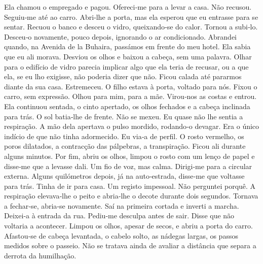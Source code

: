 Ela chamou o empregado e pagou. Ofereci­‑me para a levar a casa. Não
recusou. Seguiu­‑me até ao carro. Abri­‑lhe a porta, mas ela esperou que
eu entrasse para se sentar. Recuou o banco e desceu o vidro,
queixando­‑se do calor. Tornou a subi­‑lo. Desceu­‑o novamente, pouco
depois, ignorando o ar condicionado. Abrandei quando, na Avenida de la
Buhaira, passámos em frente do meu hotel. Ela sabia que eu ali morava.
Desviou os olhos e baixou a cabeça, sem uma palavra. Olhar para o
edifício de vidro parecia implicar algo que ela teria de recusar, ou a
que ela, se eu lho exigisse, não poderia dizer que não. Ficou calada até
pararmos diante da sua casa. Estremeceu. O filho estava à porta, voltado
para nós. Fixou o carro, sem expressão. Olhou para mim, para a mãe.
Virou­‑nos as costas e entrou. Ela continuou sentada, o cinto apertado,
os olhos fechados e a cabeça inclinada para trás. O sol batia­‑lhe de
frente. Não se mexeu. Eu quase não lhe sentia a respiração. A mão dela
apertava o pulso mordido, rodando­‑o devagar. Era o único indício de que
não tinha adormecido. Eu via­‑a de perfil. O rosto vermelho, os poros
dilatados, a contracção das pálpebras, a transpiração. Ficou ali durante
alguns minutos. Por fim, abriu os olhos, limpou o rosto com um lenço de
papel e disse­‑me que a levasse dali. Um fio de voz, mas calma.
Dirigi­‑me para a circular externa. Alguns quilómetros depois, já na
auto­‑estrada, disse­‑me que voltasse para trás. Tinha de ir para casa.
Um registo impessoal. Não perguntei porquê. A respiração elevava­‑lhe o
peito e abria­‑lhe o decote durante dois segundos. Tornava a fechar­‑se,
abria­‑se novamente. Saí na primeira cortada e inverti a marcha.
Deixei­‑a à entrada da rua. Pediu­‑me desculpa antes de sair. Disse que
não voltaria a acontecer. Limpou os olhos, apesar de secos, e abriu a
porta do carro. Afastou­‑se de cabeça levantada, o cabelo solto, as
nádegas largas, os passos medidos sobre o passeio. Não se tratava ainda
de avaliar a distância que separa a derrota da humilhação.

